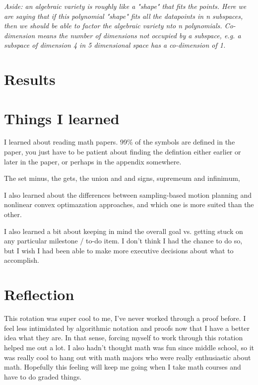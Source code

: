 \documentclass[a4paper]{article}
\begin{document}
 \textit{Aside: an algebraic variety is roughly like a "shape" that fits the points. Here we are saying that if this polynomial "shape" fits all the
 datapoints in n subspaces, then we should be able to factor the algebraic variety nto n polynomials.  Co-dimension means the number of dimensions not
 occupied by a subspace, e.g. a subspace of dimension 4 in 5 dimensional space has a co-dimension of 1. }
\section{Results}


\section{Things I learned}

I learned about reading math papers. 99\% of the symbols are defined in the
paper, you just have to be patient about finding the defintion either earlier or later in
the paper, or perhaps in the appendix somewhere.

The set minus, the gets, the union and and signs, supremeum and infinimum, 


I also learned about the differences between sampling-based motion planning and
nonlinear convex optimazation approaches, and which one is more suited than the
other.

I also learned a bit about keeping in mind the overall goal vs. getting stuck on
any particular milestone / to-do item. I don't think I had the chance to do so,
but I wish I had been able to make more executive decisions about what to
accomplish. 

\section{Reflection}

This rotation was super cool to me, I've never worked through a proof before. I
feel less intimidated by algorithmic notation and proofs now that I have a
better idea what they are. In that sense, forcing myself to work through this
rotation helped me out a lot. I also hadn't thought math was fun since middle
school, so it was really cool to hang out with math majors who were really
enthusiastic about math. Hopefully this feeling will keep me going when I take
math courses and have to do graded things.
\end{document}
